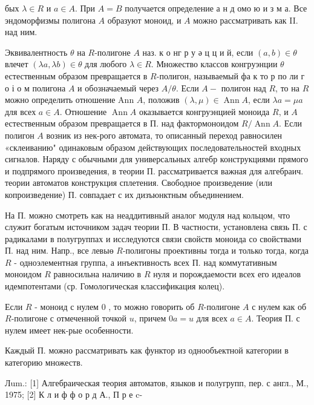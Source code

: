 \documentclass[10pt]{article}
\begin{document}
бых $\lambda \in R$ и $a \in A$. При $A=B$ получается определение а н д омо ю и з м а. Все эндоморфизмы полигона $A$ образуют моноид, и $A$ можно рассматривать как II. над ним.



Эквивалентность $\theta$ на $R$-полигоне $A$ наз. к о нг р у ә ц ц и й, если $(a, b) \in \theta$ влечет $(\lambda a, \lambda b) \in \theta$ для любого $\lambda \in R$. Множество классов конгруэнции $\theta$ естественным образом превращается в $R$-полигон, называемый фа к то р по ли г о і о м полигона $A$ и обозначаемый через $A / \theta$. Если $A-$ полигон над $R$, то на $R$ можно определить отношение Ann $A$, положив $(\lambda, \mu) \in \operatorname{Ann} A$, если $\lambda a=\mu a$ для всех $a \in A$. Отношение $\operatorname{Ann} A$ оказывается конгруэнцией моноида $R$, и $A$ естественным образом превращается в П. над фактормоноидом $R / \operatorname{Ann} A$. Если полигон $A$ возник из нек-рого автомата, то описанный переход равносилен «склеиванию" одинаковым образом действующих последовательностей входных сигналов. Наряду с обычными для универсальных алгебр конструкциями прямого и подпрямого произведения, в теории П. рассматривается важная для алгебраич. теории автоматов конструкция сплетения. Свободное произведение (или копроизведение) П. совпадает с их дизъюнктным объединением.



На П. можно смотреть как на неаддитивный аналог модуля над кольцом, что служит богатым источником задач теории П. В частности, установлена связь П. с радикалами в полугруппах и исследуются связи свойств моноида со свойствами П. над ним. Напр., все левыө $R$-полигоны проективны тогда и только тогда, когда $R$ - одноэлементная группа, а инъективность всех П. над коммутативным моноидом $R$ равносильна наличию в $R$ нуля и порождаемости всех его идеалов идемпотентами (ср. Гомологическая классификация колец).



Если $R$ - моноид с нулем 0 , то можно говорить об $R$-полигоне $A$ с нулем как об $R$-полигоне с отмеченной точкой $u$, причем $0 a=u$ для всех $a \in A$. Теория П. с нулем имеет нек-рые особенности.



Каждый П. можно рассматривать как функтор из однообъектной категории в категорию множеств.



Лum.: [1] Алгебраическая теория автоматов, языков и полугрупп, пер. с англ., М., 1975; [2] К л и ф ф о р д А., П р е c-
\end{document}
